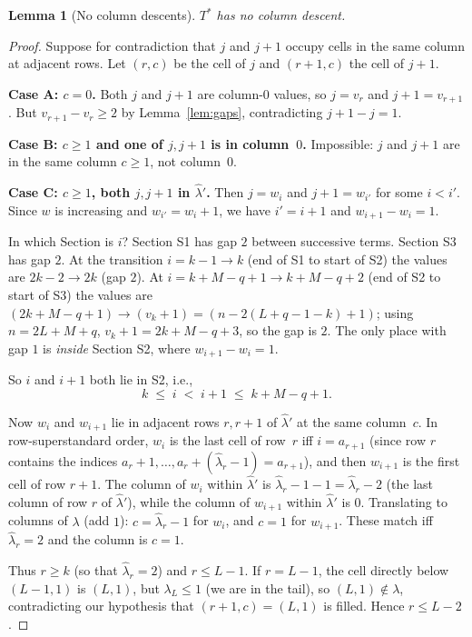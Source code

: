 \documentclass[11pt]{article}
\newtheorem{lemma}[theorem]{Lemma}
\theoremstyle{definition}
\newcommand{\hatl}{\widehat\lambda}
\begin{document}
\begin{lemma}[No column descents]\label{lem:no-col-descent}
$T^*$ has no column descent.
\end{lemma}

\begin{proof}
Suppose for contradiction that $j$ and $j+1$ occupy cells in the same
column at adjacent rows.  Let $(r, c)$ be the cell of $j$ and
$(r+1, c)$ the cell of $j+1$.

\textbf{Case A: $c = 0$.}  Both $j$ and $j+1$ are column-$0$ values,
so $j = v_r$ and $j+1 = v_{r+1}$.  But $v_{r+1} - v_r \ge 2$ by
Lemma~\ref{lem:gaps}, contradicting $j+1 - j = 1$.

\textbf{Case B: $c \ge 1$ and one of $j, j+1$ is in column~$0$.}
Impossible: $j$ and $j+1$ are in the same column $c \ge 1$, not column~$0$.

\textbf{Case C: $c \ge 1$, both $j, j+1$ in $\hatl'$.}  Then $j = w_i$
and $j+1 = w_{i'}$ for some $i < i'$.  Since $w$ is increasing and
$w_{i'} = w_i + 1$, we have $i' = i+1$ and $w_{i+1} - w_i = 1$.

In which Section is $i$?  Section S1 has gap $2$ between successive
terms.  Section S3 has gap $2$.  At the transition $i = k-1 \to k$
(end of S1 to start of S2) the values are $2k-2 \to 2k$ (gap $2$).
At $i = k+M-q+1 \to k+M-q+2$ (end of S2 to start of S3) the values
are $(2k + M - q + 1) \to (v_k + 1) = (n - 2(L+q-1-k) + 1)$;
using $n = 2L + M + q$, $v_k + 1 = 2k + M - q + 3$, so the gap is
$2$.  The only place with gap $1$ is \emph{inside} Section S2, where
$w_{i+1} - w_i = 1$.

So $i$ and $i+1$ both lie in S2, i.e.,
\begin{equation}\label{eq:S2-range}
   k \;\le\; i \;<\; i+1 \;\le\; k + M - q + 1.
\end{equation}

Now $w_i$ and $w_{i+1}$ lie in adjacent rows $r, r+1$ of $\hatl'$ at
the same column~$c$.  In row-superstandard order, $w_i$ is the last
cell of row~$r$ iff $i = a_{r+1}$ (since row $r$ contains the indices
$a_r + 1, \ldots, a_r + (\hatl_r - 1) = a_{r+1}$), and then $w_{i+1}$
is the first cell of row $r+1$.  The column of $w_i$ within $\hatl'$
is $\hatl_r - 1 - 1 = \hatl_r - 2$ (the last column of row $r$ of
$\hatl'$), while the column of $w_{i+1}$ within $\hatl'$ is $0$.
Translating to columns of $\lambda$ (add $1$): $c = \hatl_r - 1$ for
$w_i$, and $c = 1$ for $w_{i+1}$.  These match iff $\hatl_r = 2$ and
the column is $c = 1$.

Thus $r \ge k$ (so that $\hatl_r = 2$) and $r \le L-1$.  If $r = L-1$,
the cell directly below $(L-1, 1)$ is $(L, 1)$, but $\lambda_L \le 1$
(we are in the tail), so $(L, 1) \notin \lambda$, contradicting our
hypothesis that $(r+1, c) = (L, 1)$ is filled.  Hence $r \le L-2$.


\end{proof}
\end{document}
